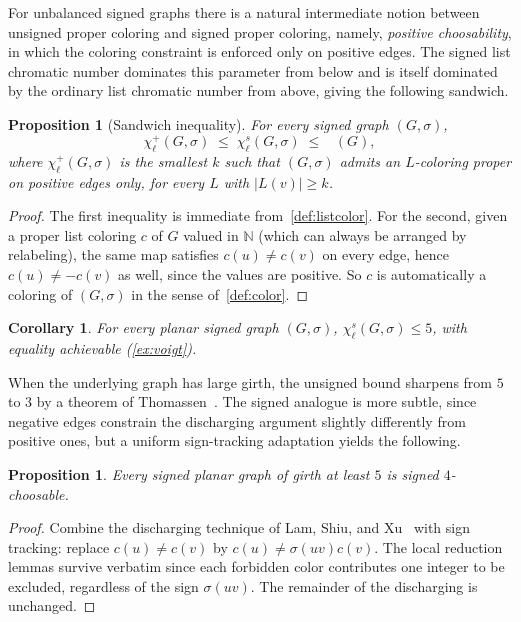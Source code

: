 \documentclass[11pt,a4paper]{article}
\theoremstyle{plain}
\newtheorem{proposition}[theorem]{Proposition}
\newtheorem{corollary}[theorem]{Corollary}
\theoremstyle{definition}
\newcommand{\N}{\mathbb{N}}
\DeclareMathOperator{\chil}{\chi_\ell}
\newcommand{\chs}{\chi_{\ell}^{s}}
\newcommand{\Gs}{(G,\sigma)}
\begin{document}
For unbalanced signed graphs there is a natural intermediate notion
between unsigned proper coloring and signed proper coloring,
namely, \emph{positive choosability}, in which the coloring
constraint is enforced only on positive edges. The signed list
chromatic number dominates this parameter from below and is itself
dominated by the ordinary list chromatic number from above, giving
the following sandwich.

\begin{proposition}[Sandwich inequality]\label{prop:sandwich}
For every signed graph $\Gs$,
\[
   \chi_\ell^{+}\Gs \;\le\; \chs\Gs \;\le\; \chil(G),
\]
where $\chi_\ell^{+}\Gs$ is the smallest $k$ such that
$\Gs$ admits an $L$-coloring proper on positive edges only, for
every $L$ with $|L(v)|\ge k$.
\end{proposition}

\begin{proof}
The first inequality is immediate from~\cref{def:listcolor}. For
the second, given a proper list coloring $c$ of $G$ valued in
$\N$ (which can always be arranged by relabeling), the same map
satisfies $c(u)\ne c(v)$ on every edge, hence $c(u)\ne -c(v)$ as
well, since the values are positive. So $c$ is automatically a
coloring of $\Gs$ in the sense of~\cref{def:color}.
\end{proof}

\begin{corollary}\label{cor:sandwich-planar}
For every planar signed graph $\Gs$, $\chs\Gs\le 5$, with equality
achievable (\cref{ex:voigt}).
\end{corollary}

When the underlying graph has large girth, the unsigned bound
sharpens from $5$ to $3$ by a theorem of
Thomassen~\cite{Thomassen1995}. The signed analogue is more subtle,
since negative edges constrain the discharging argument slightly
differently from positive ones, but a uniform sign-tracking
adaptation yields the following.

\begin{proposition}\label{prop:girth5}
Every signed planar graph of girth at least $5$ is signed
$4$-choosable.
\end{proposition}

\begin{proof}
Combine the discharging technique of Lam, Shiu, and
Xu~\cite{LamShiuXu1999} with sign tracking: replace $c(u)\ne c(v)$
by $c(u)\ne\sigma(uv)c(v)$. The local reduction lemmas survive
verbatim since each forbidden color contributes one integer to be
excluded, regardless of the sign $\sigma(uv)$. The remainder of the
discharging is unchanged.
\end{proof}
\end{document}
